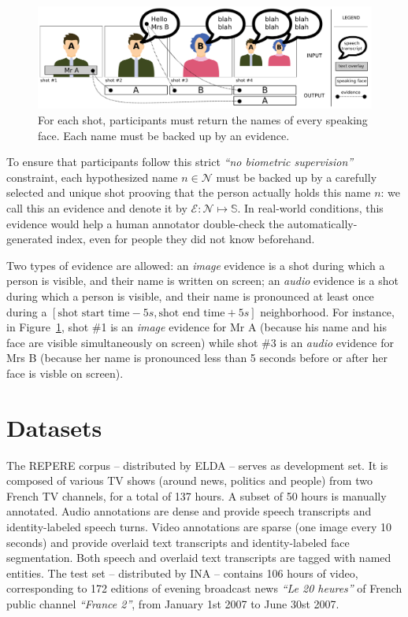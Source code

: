 \documentclass{acm_proc_article-me}
\newcommand\shots{\mathbb{S}}
\newcommand\hypEvidences{\mathcal{E}}
\newcommand\hypNames{\mathcal{N}}
\begin{document}
\begin{figure}[!htb]
 \centering
 \includegraphics[width=1.\linewidth]{figs/evidence.pdf}
 \vspace{-0.5cm}
 \caption{For each shot, participants must return the names of every speaking face. Each name must be backed up by an evidence.}
 \label{fig:evidence}
\end{figure}

To ensure that participants follow this strict \emph{``no biometric supervision''} constraint, each hypothesized name $n \in \hypNames$ must be backed up by a carefully selected and unique shot prooving that the person actually holds this name $n$: we call this an evidence and denote it by $\hypEvidences : \hypNames \mapsto \shots$. In real-world conditions, this evidence would help a human annotator double-check the automatically-generated index, even for people they did not know beforehand.

Two types of evidence are allowed: an \emph{image} evidence is a shot during which a person is visible, and their name is written on screen; an \emph{audio} evidence is a shot during which a person is visible, and their name is pronounced at least once during a $[\text{shot start time} - 5s, \text{shot end time} + 5s ]$ neighborhood.
For instance, in Figure~\ref{fig:evidence}, shot \#1 is an \emph{image} evidence for Mr A (because his name and his face are visible simultaneously on screen) while shot \#3 is an \emph{audio} evidence for Mrs B (because her name is pronounced less than 5 seconds before or after her face is visble on screen).

\section{Datasets}

The REPERE corpus -- distributed by ELDA -- serves as development set. It is composed of various TV shows (around news, politics and people) from two French TV channels, for a total of 137 hours. A subset of 50 hours is manually annotated. Audio annotations are dense and provide speech transcripts and identity-labeled speech turns. Video annotations are sparse (one image every 10 seconds) and provide overlaid text transcripts and identity-labeled face segmentation. Both speech and overlaid text transcripts are tagged with named entities.
The test set -- distributed by INA -- contains 106 hours of video, corresponding to 172 editions of evening broadcast news \emph{``Le 20 heures''} of French public channel \emph{``France 2''}, from January 1st 2007 to June 30st 2007.
\end{document}
